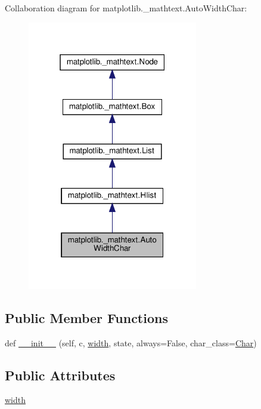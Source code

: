 Collaboration diagram for matplotlib.\+\_\+mathtext.\+Auto\+Width\+Char\+:
\nopagebreak
\begin{figure}[H]
\begin{center}
\leavevmode
\includegraphics[width=211pt]{classmatplotlib_1_1__mathtext_1_1AutoWidthChar__coll__graph}
\end{center}
\end{figure}
\subsection*{Public Member Functions}
\begin{DoxyCompactItemize}
\item 
def \hyperlink{classmatplotlib_1_1__mathtext_1_1AutoWidthChar_a3a543aae6f311fc3c0aed40105434288}{\+\_\+\+\_\+init\+\_\+\+\_\+} (self, c, \hyperlink{classmatplotlib_1_1__mathtext_1_1AutoWidthChar_a6b42e6b8008d91bc4f52bb7fc5b849a2}{width}, state, always=False, char\+\_\+class=\hyperlink{classmatplotlib_1_1__mathtext_1_1Char}{Char})
\end{DoxyCompactItemize}
\subsection*{Public Attributes}
\begin{DoxyCompactItemize}
\item 
\hyperlink{classmatplotlib_1_1__mathtext_1_1AutoWidthChar_a6b42e6b8008d91bc4f52bb7fc5b849a2}{width}
\end{DoxyCompactItemize}


